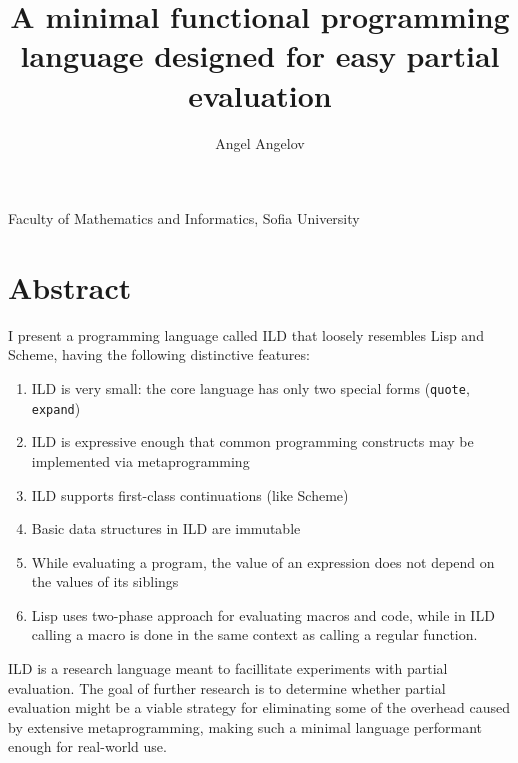\documentclass[11pt]{amsart}
\title[Title]{\bf A minimal functional programming language designed for easy partial evaluation}
\author[Angel]{Angel Angelov}
\newcommand\lang{ILD }
\theoremstyle{definition}
\begin{document}
\maketitle

\begin{center}
Faculty of Mathematics and Informatics, Sofia University
\end{center}

\section*{Abstract}

I present a programming language called \lang that loosely resembles Lisp
and Scheme, having the following distinctive features:

\begin{enumerate}
    \item \lang is very small: the core language has only two special
    forms (\texttt{quote}, \texttt{expand})
    \item \lang is expressive enough that common programming constructs may
    be implemented via metaprogramming
    \item \lang supports first-class continuations (like Scheme)
    \item\label{immutable} Basic data structures in \lang are immutable
    \item\label{isolatedsiblings} While evaluating a program, the value of an expression does not
    depend on the values of its siblings
    \item\label{runtimemacros} Lisp uses two-phase approach for evaluating macros and code,
    while in \lang calling a macro is done in the same context as
    calling a regular function.
\end{enumerate}

\lang is a research language meant to facillitate experiments with partial evaluation.
The goal of further research is to determine whether partial evaluation might be
a viable strategy for eliminating some of the overhead caused by extensive metaprogramming,
making such a minimal language performant enough for real-world use.



%
%
%
%

\bigskip
\end{document}
